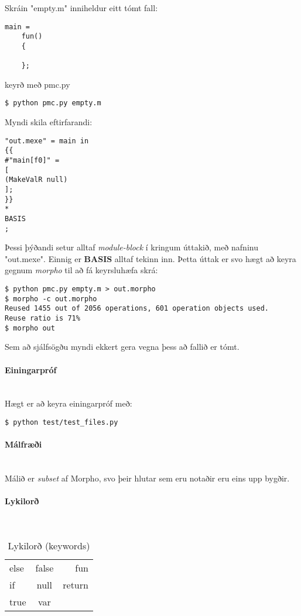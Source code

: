 \documentclass{article}
\begin{document}
Skráin "empty.m" inniheldur eitt tómt fall:
\begin{verbatim}
main = 
	fun()
	{
		
	};
\end{verbatim}

keyrð með pmc.py
\begin{verbatim}
$ python pmc.py empty.m
\end{verbatim}

Myndi skila eftirfarandi:

\begin{verbatim}
"out.mexe" = main in
{{
#"main[f0]" =
[
(MakeValR null)
];
}}
*
BASIS
;
\end{verbatim}

Þessi þýðandi setur alltaf \emph{module-block} í kringum úttakið, með nafninu "out.mexe". Einnig er \textbf{BASIS} alltaf tekinn inn. 
Þetta úttak er svo hægt að keyra gegnum \emph{morpho} til að fá keyrsluhæfa skrá:

\begin{verbatim}
$ python pmc.py empty.m > out.morpho
$ morpho -c out.morpho
Reused 1455 out of 2056 operations, 601 operation objects used.
Reuse ratio is 71%
$ morpho out
\end{verbatim}

Sem að sjálfsögðu myndi ekkert gera vegna þess að fallið er tómt.

\paragraph{Einingarpróf} ~\\

Hægt er að keyra einingarpróf með:
\begin{verbatim}
$ python test/test_files.py
\end{verbatim}

\clearpage
\paragraph{{\Large Málfræði}} ~\\

Málið er \emph{subset} af Morpho, svo þeir hlutar sem eru notaðir eru eins upp bygðir.

\paragraph{Lykilorð} ~\\
\begin{table}[h!]
	\begin{center}
	\begin{tabular}{ l c r }
	  else & false & fun \\     
	  if   & null  & return \\   
	  true & var \\   
	  \hline
	\end{tabular}
	\caption{Lykilorð (keywords)}
	\end{center}
\end{table}
\end{document}
